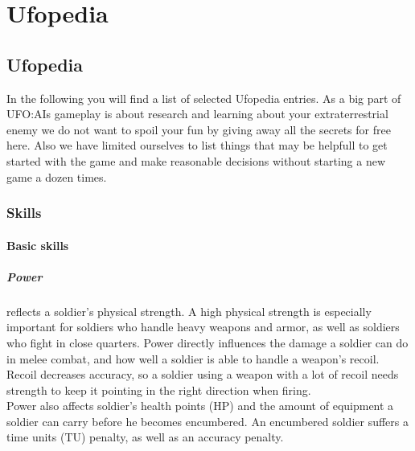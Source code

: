 
%
%


\chapter{Ufopedia}

\section{Ufopedia}
In the following you will find a list of selected Ufopedia entries. As a big part of UFO:AIs gameplay is about research and learning about your extraterrestrial enemy we do not want to spoil your fun by giving away all the secrets for free here. Also we have limited ourselves to list things that may be helpfull to get started with the game and make reasonable decisions without starting a new game a dozen times.

\subsection{Skills}
\subsubsection{Basic skills}
\paragraph*{Power}
 reflects a soldier's physical strength. A high physical strength is especially important for soldiers who handle heavy weapons and armor, as well as soldiers who fight in close quarters. Power directly influences the damage a soldier can do in melee combat, and how well a soldier is able to handle a weapon's recoil. Recoil decreases accuracy, so a soldier using a weapon with a lot of recoil needs strength to keep it pointing in the right direction when firing.\\
Power also affects soldier's health points (HP) and the amount of equipment a soldier can carry before he becomes encumbered. An encumbered soldier suffers a time units (TU) penalty, as well as an accuracy penalty. 
